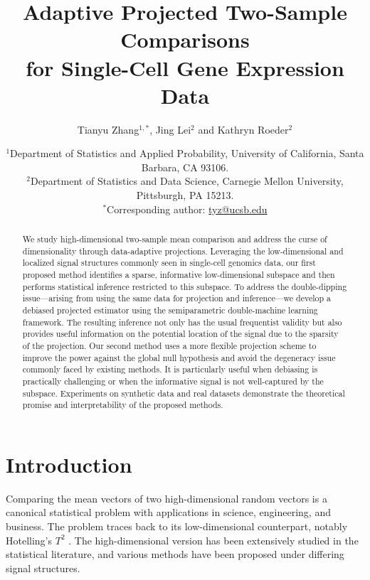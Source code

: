 \documentclass[11pt]{article}
\begin{document}
\title{Adaptive Projected Two-Sample Comparisons \\for Single-Cell Gene Expression Data
}

\author{
  Tianyu Zhang$^{1,*}$,
  Jing Lei$^{2}$ and 
  Kathryn Roeder$^{2}$
}

\date{
  {\small
  $^{1}$Department of Statistics and Applied Probability, University of California, Santa Barbara, CA 93106.\\
  $^{2}$Department of Statistics and Data Science, Carnegie Mellon University, Pittsburgh, PA 15213.\\
  $^{*}$Corresponding author: \url{tyz@ucsb.edu}\\
  }
}

\maketitle
\begin{abstract}
We study high-dimensional two-sample mean comparison and address the curse of dimensionality through data-adaptive projections. Leveraging the low-dimensional and localized signal structures commonly seen in single-cell genomics data, our first proposed method identifies a sparse, informative low-dimensional subspace and then performs statistical inference restricted to this subspace. To address the double-dipping issue---arising from using the same data for projection and inference---we develop a debiased projected estimator using the semiparametric double-machine learning framework. The resulting inference not only has the usual frequentist validity but also provides useful information on the potential location of the signal due to the sparsity of the projection. Our second method uses a more flexible projection scheme to improve the power against the global null hypothesis and avoid the degeneracy issue commonly faced by existing methods. It is particularly useful when debiasing is practically challenging or when the informative signal is not well-captured by the subspace. Experiments on synthetic data and real datasets demonstrate the theoretical promise and interpretability of the proposed methods.  
\end{abstract}

\tableofcontents

\section{Introduction}\label{section: intro}

Comparing the mean vectors of two high-dimensional random vectors is a canonical statistical problem with applications in science, engineering, and business. The problem traces back to its low-dimensional counterpart, notably Hotelling's $T^2$ \citep{hotellings}. The high-dimensional version has been extensively studied in the statistical literature, and various methods have been proposed under differing signal structures.
\end{document}
